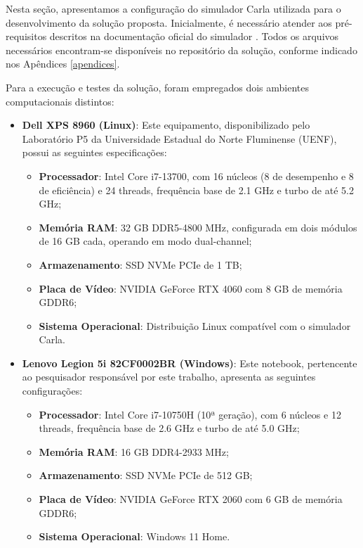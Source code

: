 Nesta seção, apresentamos a configuração do simulador Carla utilizada para o desenvolvimento da solução proposta. Inicialmente, é necessário atender aos pré-requisitos descritos na documentação oficial do simulador \cite{University_of_Toronto2018-fe}. Todos os arquivos necessários encontram-se disponíveis no repositório da solução, conforme indicado nos Apêndices \ref{apendices}.

Para a execução e testes da solução, foram empregados dois ambientes computacionais distintos:

\begin{itemize}
    \item \textbf{Dell XPS 8960 (Linux)}: Este equipamento, disponibilizado pelo Laboratório P5 da Universidade Estadual do Norte Fluminense (UENF), possui as seguintes especificações:
    \begin{itemize}
        \item \textbf{Processador}: Intel Core i7-13700, com 16 núcleos (8 de desempenho e 8 de eficiência) e 24 threads, frequência base de 2.1 GHz e turbo de até 5.2 GHz;
        \item \textbf{Memória RAM}: 32 GB DDR5-4800 MHz, configurada em dois módulos de 16 GB cada, operando em modo dual-channel;
        \item \textbf{Armazenamento}: SSD NVMe PCIe de 1 TB;
        \item \textbf{Placa de Vídeo}: NVIDIA GeForce RTX 4060 com 8 GB de memória GDDR6;
        \item \textbf{Sistema Operacional}: Distribuição Linux compatível com o simulador Carla.
    \end{itemize}
    
    \item \textbf{Lenovo Legion 5i 82CF0002BR (Windows)}: Este notebook, pertencente ao pesquisador responsável por este trabalho, apresenta as seguintes configurações:
    \begin{itemize}
        \item \textbf{Processador}: Intel Core i7-10750H (10ª geração), com 6 núcleos e 12 threads, frequência base de 2.6 GHz e turbo de até 5.0 GHz;
        \item \textbf{Memória RAM}: 16 GB DDR4-2933 MHz;
        \item \textbf{Armazenamento}: SSD NVMe PCIe de 512 GB;
        \item \textbf{Placa de Vídeo}: NVIDIA GeForce RTX 2060 com 6 GB de memória GDDR6;
        \item \textbf{Sistema Operacional}: Windows 11 Home.
    \end{itemize}
\end{itemize}

